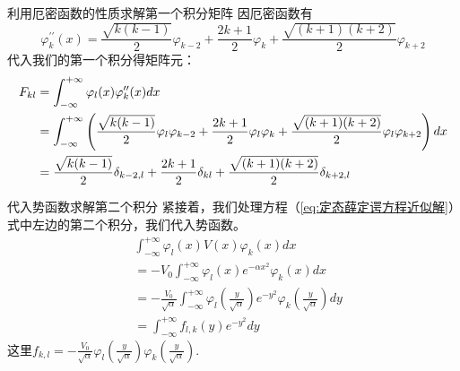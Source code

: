 \documentclass[aspectratio=169]{beamer}
\begin{document}
\begin{frame}{利用厄密函数的性质求解第一个积分矩阵}
    因厄密函数有
    \begin{equation}
        \boxed{ \varphi_{k}^{\prime\prime}(x)=\frac{\sqrt{k(k-1)}}{2}\varphi_{k-2} + \frac{2k+1}{2}\varphi_{k} + \frac{\sqrt{(k+1)(k+2)}}{2}\varphi_{k+2}}
        \label{eq:二阶导递推}
    \end{equation}
代入我们的第一个积分得矩阵元：
\begin{align}
    F_{kl} &= \int_{-\infty}^{+\infty}\varphi_{l}(x)\varphi_{k}^{\prime\prime}(x)dx \notag \\
    &= \int_{-\infty}^{+\infty}\left(\frac{\sqrt{k(k-1)}}{2}\varphi_{l}\varphi_{k-2}+\frac{2k+1}{2}\varphi_{l}\varphi_{k}+\frac{\sqrt{(k+1)(k+2)}}{2}\varphi_{l}\varphi_{k+2}\right)dx \notag \\
    &= \frac{\sqrt{k(k-1)}}{2}\delta_{k-2,l} + \frac{2k+1}{2}\delta_{kl} + \frac{\sqrt{(k+1)(k+2)}}{2}\delta_{k+2,l}
\end{align} 
\end{frame}

\begin{frame}{代入势函数求解第二个积分}
紧接着，我们处理方程（\ref{eq:定态薛定谔方程近似解}）式中左边的第二个积分，我们代入势函数。
\begin{equation}
\begin{aligned}
    & \int_{-\infty}^{+\infty}\varphi_{l}(x)V(x)\varphi_{k}(x)dx \\
    & = -V_{0}\int_{-\infty}^{+\infty}\varphi_{l}(x)e^{-\alpha x^{2}}\varphi_{k}(x)dx \\
    & = -\frac{V_{0}}{\sqrt{\alpha}}\int_{-\infty}^{+\infty}\varphi_{l}\left(\frac{y}{\sqrt{\alpha}}\right)e^{-y^{2}}\varphi_{k}\left(\frac{y}{\sqrt{\alpha}}\right)dy \\
    & = \int_{-\infty}^{+\infty}f_{l,k}(y)e^{-y^{2}}dy
\end{aligned}
\end{equation}
这里$f_{k,l}=-\frac{V_{0}}{\sqrt{\alpha}}\varphi_{l}(\frac{y}{\sqrt{\alpha}})\varphi_{k}(\frac{y}{\sqrt{\alpha}}).$
\end{frame}
\end{document}
